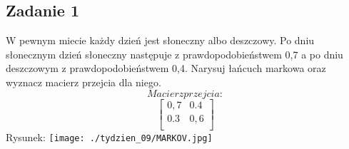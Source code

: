 \subsection{Zadanie 1}
W pewnym miecie każdy dzień jest słoneczny albo deszczowy.
Po dniu słonecznym dzień słoneczny następuje z prawdopodobieństwem 0,7 a po dniu deszczowym z prawdopodobieństwem 0,4.
Narysuj łańcuch markowa oraz wyznacz macierz przejcia dla niego.
$$
Macierz przejcia: 
$$
$$
\left[
\begin{array}{ccc}
0,7 & 0.4 \\
0.3 & 0,6 \\
\end{array}
\right]
$$
\centering
Rysunek:
\texttt{[image: ./tydzien\_09/MARKOV.jpg]}
